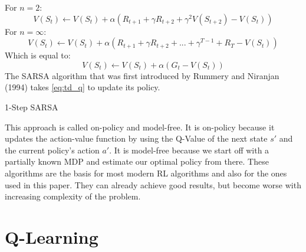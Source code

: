 For $n = 2$:
\begin{equation} \label{eq:td_v}
	V(S_t) \leftarrow V(S_t) + \alpha (R_{t+1} + \gamma R_{t+2} + \gamma ^2 V(S_{t+2}) - V(S_t))
\end{equation}
For $n = \infty$:
\begin{equation} \label{eq:td_v}
	V(S_t) \leftarrow V(S_t) + \alpha (R_{t+1} + \gamma R_{t+2} + ... + \gamma ^{T-1} + R_T - V(S_t))
\end{equation}
Which is equal to:
\begin{equation} \label{eq:td_v}
	V(S_t) \leftarrow V(S_t) + \alpha (G_t - V(S_t))
\end{equation}
The SARSA algorithm that was first introduced by Rummery and Niranjan (1994) \cite{sarsa} takes \ref{eq:td_q} to update its policy.
\begin{algorithm}[H]
  \caption{1-Step SARSA}
  \label{alg:sarsa}
  \begin{algorithmic}[1]
		\EndWhile
	\EndFor
  \end{algorithmic}
\end{algorithm}
This approach is called on-policy and model-free.
It is on-policy because it updates the action-value function by using the Q-Value of the next state $s'$ and the current policy's action $a'$.
It is model-free because we start off with a partially known MDP and estimate our optimal policy from there.
These algorithms are the basis for most modern RL algorithms and also for the ones used in this paper.
They can already achieve good results, but become worse with increasing complexity of the problem.


\section{Q-Learning}

